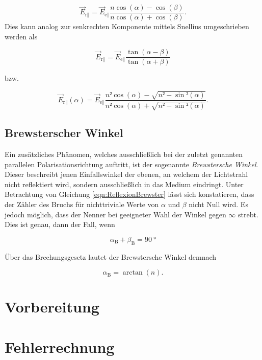 \begin{equation*}
    \vec{E}_{\text{r}\parallel} = \vec{E}_{\text{e}\parallel}\frac{n\cos(\alpha)-\cos(\beta)}{n\cos(\alpha)+\cos(\beta)}.
\end{equation*}
 \noindent Dies kann analog zur senkrechten Komponente mittels Snellius umgeschrieben werden als 

 \begin{equation}
    \vec{E}_{\text{r}\parallel} = \vec{E}_{\text{e}\parallel}\frac{\tan(\alpha-\beta)}{\tan(\alpha+\beta)}
\label{eqn:ReflexionBrewster} 
\end{equation}

 \noindent bzw.

\begin{equation}
    \vec{E}_{\text{r}\parallel}(\alpha) = \vec{E}_{\text{e}\parallel}\frac{n²\cos(\alpha)-\sqrt{n²-\sin²(\alpha)}}{n²\cos(\alpha)+\sqrt{n²-\sin²(\alpha)}}.
\label{eqn:21}
\end{equation}

\subsection{Brewsterscher Winkel}
\label{sec:Brewster}

Ein zusätzliches Phänomen, welches ausschließlich bei der zuletzt genannten parallelen Polarisationsrichtung auftritt, ist der sogenannte \emph{Brewstersche Winkel}.
Dieser beschreibt jenen Einfallswinkel der ebenen, an welchem der Lichtstrahl nicht reflektiert wird, sondern ausschließlich in das Medium eindringt.
Unter Betrachtung von Gleichung \eqref{eqn:ReflexionBrewster} lässt sich konstatieren, dass der Zähler des Bruchs für nichttriviale Werte von $\alpha$ und $\beta$ nicht
Null wird. Es jedoch möglich, dass der Nenner bei geeigneter Wahl der Winkel gegen $\infty$ strebt. Dies ist genau, dann der Fall, wenn 

\begin{equation*}
    \alpha_\text{B} + \beta_\text{B} = \qty{90}{\degree}
\end{equation*}

\noindent Über das Brechungsgesetz lautet der Brewstersche Winkel demnach

\begin{equation*}
    \alpha_\text{B} = \arctan(n).
\end{equation*}


\section{Vorbereitung}

\section{Fehlerrechnung}

